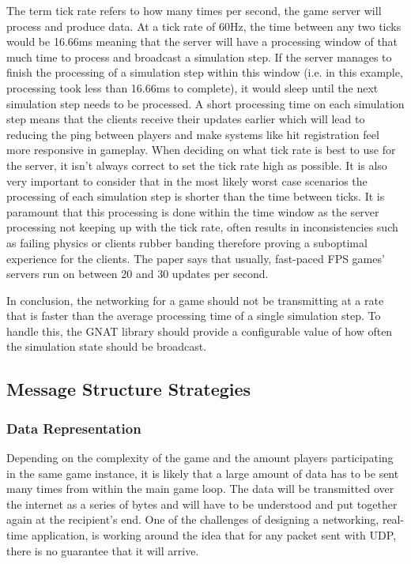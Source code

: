 The term tick rate refers to how many times per second, the game server will process and produce data. At a tick rate of 60Hz, the time between any two ticks would be 16.66ms meaning that the server will have a processing window of that much time to process and broadcast a simulation step. If the server manages to finish the processing of a simulation step within this window (i.e. in this example, processing took less than 16.66ms to complete), it would sleep until the next simulation step needs to be processed. A short processing time on each simulation step means that the clients receive their updates earlier which will lead to reducing the ping between players and make systems like hit registration feel more responsive in gameplay. When deciding on what tick rate is best to use for the server, it isn't always correct to set the tick rate high as possible. It is also very important to consider that in the most likely worst case scenarios the processing of each simulation step is shorter than the time between ticks. It is paramount that this processing is done within the time window as the server processing not keeping up with the tick rate, often results in inconsistencies such as failing physics or clients rubber banding therefore proving a suboptimal experience for the clients.
The paper  says that usually, fast-paced FPS games' servers run on between 20 and 30 updates per second.

In conclusion, the networking for a game should not be transmitting at a rate that is faster than the average processing time of a single simulation step. To handle this, the GNAT library should provide a configurable value of how often the simulation state should be broadcast.


\subsection{Message Structure Strategies}
\subsubsection{Data Representation}
Depending on the complexity of the game and the amount players participating in the same game instance, it is likely that a large amount of data has to be sent many times from within the main game loop. The data will be transmitted over the internet as a series of bytes and will have to be understood and put together again at the recipient's end. One of the challenges of designing a networking, real-time application, is working around the idea that for any packet sent with UDP, there is no guarantee that it will arrive.

